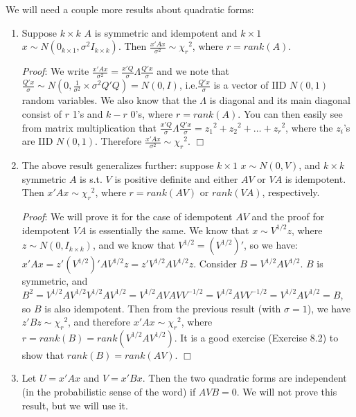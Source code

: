 \documentclass[12pt,oneside]{article}
\begin{document}
We will need a couple more results about quadratic forms:
\begin{enumerate}
\item Suppose $k \times k$ $A$ is symmetric and idempotent and $k
  \times 1$ $x \sim N(0_{k\times 1}, \sigma^2 I_{k \times k})$. Then
  $\frac{x'Ax}{\sigma^2} \sim {\chi_r}^2$, where $r = rank(A)$.

\emph{Proof}: We write
  $\frac{x'Ax}{\sigma^2} = \frac{x'Q}{\sigma} \Lambda
  \frac{Q'x}{\sigma}$ and we note that $\frac{Q'x}{\sigma} \sim N(0,
  \frac{1}{\sigma^2} \times \sigma^2 Q'Q) = N(0, I)$,
  i.e.$\frac{Q'x}{\sigma}$ is a vector of IID $N(0,1)$ random
  variables. We also know that the $\Lambda$ is diagonal and its main
  diagonal consist of $r$ 1's and $k-r$ 0's, where $r = rank(A)$. You
  can then easily see from matrix multiplication  that
  $\frac{x'Q}{\sigma} \Lambda \frac{Q'x}{\sigma} = {z_1}^2 + {z_2}^2 +
  \ldots + {z_r}^2$, where the $z_i$'s are IID $N(0,1)$. Therefore
  $\frac{x'Ax}{\sigma^2} \sim {\chi_r}^2$. $\Box$

\item The above result generalizes further: suppose $k \times1$ $x
  \sim N(0, V)$, and $k \times k$ symmetric $A$ is s.t. $V$ is
  positive definite and either $AV$ or $VA$ is
  idempotent. Then $x'Ax \sim {\chi_r}^2$, where $r =
  rank(AV)$ or $rank(VA)$, respectively.

\emph{Proof}: We will prove it for the case
  of idempotent $AV$ and the proof for idempotent $VA$ is essentially
  the same. We know that $x \sim V^{1/2}z$, where $z \sim N(0, I_{k
  \times k})$, and we know that $V^{1/2} = (V^{1/2})'$, so we have:
  $x'Ax = z'(V^{1/2})' A V^{1/2} z = z' V^{1/2} A V^{1/2} z$. Consider
  $B = V^{1/2} A V^{1/2}$. $B$ is symmetric, and $B^2 = V^{1/2} A
  V^{1/2} V^{1/2} A V^{1/2} = V^{1/2} A V A V V^{-1/2} = V^{1/2} A V
  V^{-1/2} = V^{1/2} A V^{1/2} = B$, so $B$ is also idempotent. Then
  from the previous result (with $\sigma = 1$), we have $z'Bz \sim
  {\chi_r}^2$, and therefore $x'Ax \sim {\chi_r}^2$, where $r =
  rank(B) = rank (V^{1/2} A V^{1/2})$. It is a good exercise (Exercise 8.2) to
  show that $rank(B) = rank (AV)$. $\Box$

\item Let $U = x'Ax$ and $V = x'Bx$. Then the two quadratic forms are
  independent (in the probabilistic sense of the word) if $AVB =
  0$. We will not prove this result, but we will use it.
\end{enumerate}
\end{document}
